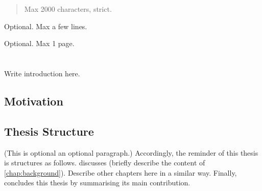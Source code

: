 \documentclass[12pt,a4paper,openright,twoside]{book}
\begin{document}
\pagestyle{empty}
	
\frontmatter




\begin{abstract}	
Max 2000 characters, strict.
\end{abstract}

\begin{dedication} %
Optional. Max a few lines.
\end{dedication}

\begin{acknowledgements} %
Optional. Max 1 page.
\end{acknowledgements}

\tableofcontents   
\listoffigures     %
\lstlistoflistings %


\mainmatter

\chapter{\introductionname}
\label{chap:introduction}

Write introduction here.

\section{Motivation}

%
\section{Thesis Structure} %
%

(This is optional an optional paragraph.)
%
Accordingly, the reminder of this thesis is structures as follows.
%
 discusses (briefly describe the content of \cref{chap:background}).
%
Describe other chapters here in a similar way.
%
Finally,  concludes this thesis by summarising its main contribution.

\end{document}
